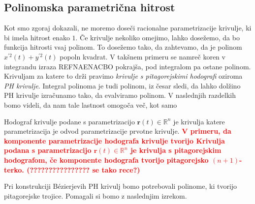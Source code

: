 \documentclass[isrm2, tisk]{fmfdelo}
\newcommand{\R}{\mathbb R}
\newcommand{\mycomment}[1]{\textbf{\textcolor{red}{#1}}}
\begin{document}
    \subsection{Polinomska parametrična hitrost}
    Kot smo zgoraj dokazali, ne moremo doseči racionalne parametrizacije krivulje, ki bi imela hitrost enako $1$.
    Če krivulje nekoliko omejimo, lahko dosežemo, da bo funkcija hitrosti vsaj polinom.
    To dosežemo tako, da zahtevamo, da je polinom $x^{'2}(t)+y^{'2}(t)$ popoln kvadrat.
    V takšnem primeru se namreč koren v integrandu izraza REFNAENACBO pokrajša, pod integralom pa ostane polinom.
    Krivuljam za katere to drži pravimo \textit{krivulje s pitagorejskimi hodografi} oziroma \textit{PH krivulje}.
    Integral polinoma je tudi polinom, iz česar sledi, da lahko dolžino PH krivulje izračunamo tako, da evalviramo polinom.
    V naslednjih razdelkih bomo videli, da nam tale lastnost omogoča več, kot samo

    \begin{definicija}
        Hodograf krivulje podane s parametrizacijo $\mathbf{r}(t)\in \R^n$ je krivulja katere parametrizacija je odvod parametrizacije prvotne krivulje.
        \mycomment{V primeru, da komponente parametrizacije hodografa krivulje tvorijo
        Krivulja podana s parametrizacijo $\mathbf{r}(t)\in \R^n$ je krivulja s pitagorejskim hodografom, če komponente hodografa tvorijo pitagorejsko $(n+1)$-terko. (???????????????? se tako rece?)}
    \end{definicija}

    Pri konstrukciji Bézierjevih PH krivulj bomo potrebovali polinome, ki tvorijo pitagorejske trojice.
    Pomagali si bomo z naslednjim izrekom.
\end{document}
